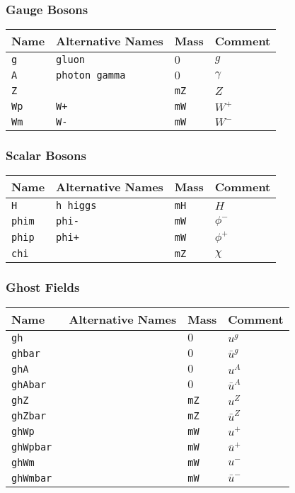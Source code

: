 \subsubsection{Gauge Bosons}
\begin{longtable}{|l|l|l|p{2cm}|}
\hline
Name&Alternative Names&Mass&Comment\\
\hline
\texttt{g }& \texttt{gluon }& $0$ & $g$ \\
\texttt{A }& \texttt{photon gamma }& $0$ & $\gamma$ \\
\texttt{Z }& & \texttt{mZ }& $Z$ \\
\texttt{Wp }& \texttt{W+}& \texttt{mW }& $W^+$ \\
\texttt{Wm }& \texttt{W-}& \texttt{mW }& $W^-$ \\
\hline
\end{longtable}

\subsubsection{Scalar Bosons}
\begin{longtable}{|l|l|l|p{2cm}|}
\hline
Name&Alternative Names&Mass&Comment\\
\hline
\texttt{H }& \texttt{h higgs }& \texttt{mH }& $H$ \\
\texttt{phim }& \texttt{phi- }& \texttt{mW }& $\phi^-$ \\
\texttt{phip }& \texttt{phi+ }& \texttt{mW }& $\phi^+$ \\
\texttt{chi }&  & \texttt{mZ }& $\chi$ \\
\hline
\end{longtable}

\subsubsection{Ghost Fields}
\begin{longtable}{|l|l|l|p{2cm}|}
\hline
Name&Alternative Names&Mass&Comment\\
\hline
\texttt{gh }&  & $0$ & $u^g$\\
\texttt{ghbar }&  & $0$ & $\bar{u}^g$ \\
\texttt{ghA }&  & $0$ & $u^A$ \\
\texttt{ghAbar }&  & $0$ & $\bar{u}^A$ \\
\texttt{ghZ }&  & \texttt{mZ }& $u^Z$ \\
\texttt{ghZbar }&  & \texttt{mZ }& $\bar{u}^Z$ \\
\texttt{ghWp }&  & \texttt{mW }& $u^+$ \\
\texttt{ghWpbar }&  & \texttt{mW }& $\bar{u}^+$ \\
\texttt{ghWm }&  & \texttt{mW }& $u^-$ \\
\texttt{ghWmbar }&  & \texttt{mW }& $\bar{u}^-$ \\
\hline
\end{longtable}

